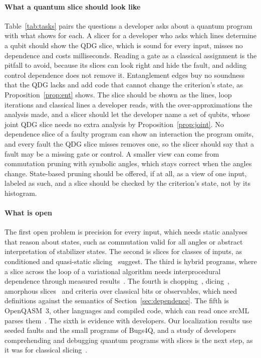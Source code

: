 \paragraph*{What a quantum slice should look like}
Table~\ref{tab:tasks} pairs the questions a developer asks about a quantum program with what \tool{} shows for
each. A slicer for a developer who asks which lines determine a qubit should show the QDG slice, which is sound for every input, misses no dependence and costs milliseconds. Reading a
gate as a classical assignment is the pitfall to avoid, because its slices can look right and hide the
fault, and adding control dependence does not remove it. Entanglement edges buy no soundness that the QDG lacks
and add code that cannot change the criterion's state, as Proposition~\ref{prop:ent} shows. The slice
should be shown as the lines, loop iterations and classical lines a developer reads, with the
over-approximations the analysis made, and a slicer should let the developer name a set of qubits, whose
joint QDG slice needs no extra analysis by Proposition~\ref{prop:joint}. No dependence slice of a faulty
program can show an interaction the program omits, and every fault the QDG slice misses removes one, so
the slicer should say that a fault may be a missing gate or control. A smaller view can come from
commutation pruning with symbolic angles, which stays correct when the angles change. State-based pruning
should be offered, if at all, as a view of one input, labeled as such, and a slice should be checked by the
criterion's state, not by its histogram.

\paragraph*{What is open}
The first open problem is precision for every input, which needs
static analyses that reason about states, such as commutation valid for all angles or abstract
interpretation of stabilizer states. The second is slices for classes of inputs, as conditioned and
quasi-static slicing~\cite{canfora1998conditioned, venkatesh1991semantic} suggest. The third is hybrid
programs, where a slice across the loop of a variational algorithm needs interprocedural dependence through
measured results~\cite{horwitz1990interprocedural}.
The fourth is chopping~\cite{jackson1994chopping},
dicing~\cite{lyle1987dicing}, amorphous slices~\cite{harman1997amorphous} and criteria over classical
bits or observables, which need definitions against the semantics of Section~\ref{sec:dependence}. The fifth is OpenQASM~3, other languages and compiled code, which \tool{} can read once srcML parses
them~\cite{behler2024supporting}. The sixth is evidence with
developers. Our localization results use seeded faults and the small programs of Bugs4Q, and a study of
developers comprehending and debugging quantum programs with slices is the next step, as it was for
classical slicing~\cite{weiser1982programmers}.
